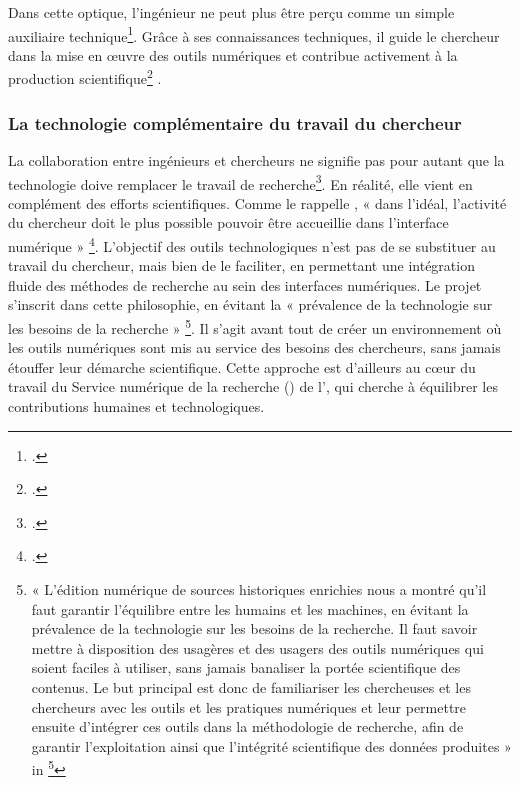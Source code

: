 Dans cette optique, l’ingénieur ne peut plus être perçu comme un simple auxiliaire technique\footcite[p.5]{massot_dessiner_2018}. Grâce à ses connaissances techniques, il guide le chercheur dans la mise en œuvre des outils numériques et contribue activement à la production scientifique\footcite[p.7]{massot_humanites_2021}  .

\subsubsection{La technologie complémentaire du travail du chercheur}

La collaboration entre ingénieurs et chercheurs ne signifie pas pour autant que la technologie doive remplacer le travail de recherche\footcite[p.453]{graham_introduction_2017}. En réalité, elle vient en complément des efforts scientifiques. Comme le rappelle \citeauthor{chateau-dutier_editions_2021}, « dans l’idéal, l’activité du chercheur doit le plus possible pouvoir être accueillie dans l’interface numérique » \footcite[p.86]{chateau-dutier_editions_2021}. L’objectif des outils technologiques n’est pas de se substituer au travail du chercheur, mais bien de le faciliter, en permettant une intégration fluide des méthodes de recherche au sein des interfaces numériques.
Le projet \pense s’inscrit dans cette philosophie, en évitant la « prévalence de la technologie sur les besoins de la recherche » \footnote{« L’édition numérique de sources historiques enrichies nous a montré qu’il faut garantir l’équilibre entre les humains et les machines, en évitant la prévalence de la technologie sur les besoins de la recherche. Il faut savoir mettre à disposition des usagères et des usagers des outils numériques qui soient faciles à utiliser, sans jamais banaliser la portée scientifique des contenus. Le but principal est donc de familiariser les chercheuses et les chercheurs avec les outils et les pratiques numériques et leur permettre ensuite d’intégrer ces outils dans la méthodologie de recherche, afin de garantir l’exploitation ainsi que l’intégrité scientifique des données produites » in \footcite{colonna_digital_2024}}. Il s’agit avant tout de créer un environnement où les outils numériques sont mis au service des besoins des chercheurs, sans jamais étouffer leur démarche scientifique. Cette approche est d’ailleurs au cœur du travail du Service numérique de la recherche (\snr) de l’\inha, qui cherche à équilibrer les contributions humaines et technologiques.

